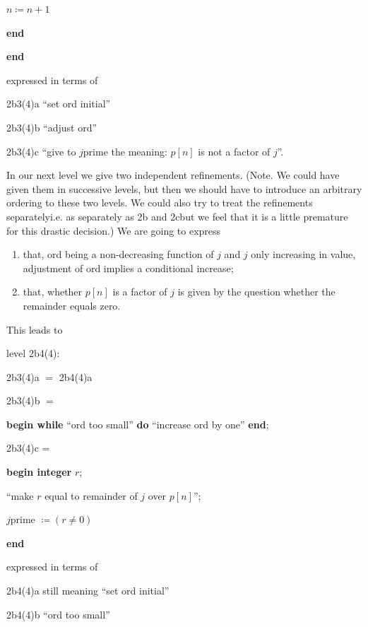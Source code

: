 \documentclass[twoside,11pt]{book}
\begin{document}
\noindent
\quad\quad\quad $n \coloneq n + 1$

\noindent
\quad\textbf{end}

\noindent
\textbf{end}

\noindent
expressed in terms of

\noindent
2b3(4)a\tabto{5em} ``set ord initial''

\noindent
2b3(4)b\tabto{5em} ``adjust ord''

\noindent
2b3(4)c\tabto{5em} ``give to $j$prime the meaning: $p[n]$ is not a factor of $j$''. 

In our next level we give two independent refinements. (Note. We could have given them in successive levels, but then we should have to introduce an arbitrary ordering to these two levels. We could also try to treat the refinements separately\textemdash{}i.e. as separately as 2b and 2c\textemdash{}but we feel that it is a little premature for this drastic decision.) We are going to express

\begin{enumerate}[leftmargin=2\parindent, label=(\arabic*)]
	\item that, ord being a non-decreasing function of $j$ and $j$ only increasing in value, adjustment of ord implies a conditional increase;

	\item that, whether $p[n]$ is a factor of $j$ is given by the question whether the remainder equals zero.
\end{enumerate}

\noindent
This leads to

\noindent
level 2b4(4):

\noindent
2b3(4)a $=$ 2b4(4)a

\noindent
2b3(4)b $=$

\noindent
\textbf{begin while} ``ord too small'' \textbf{do} ``increase ord by one'' \textbf{end};

\noindent
2b3(4)c =

\noindent
\textbf{begin integer} $r$;

\noindent
\quad ``make $r$ equal to remainder of $j$ over $p[n]$'';

\noindent
\quad $j$prime $\coloneq (r \neq 0)$

\noindent
\textbf{end}

\noindent
expressed in terms of

\noindent
2b4(4)a\tabto{5em} still meaning ``set ord initial''

\noindent
2b4(4)b\tabto{5em} ``ord too small''
\end{document}
